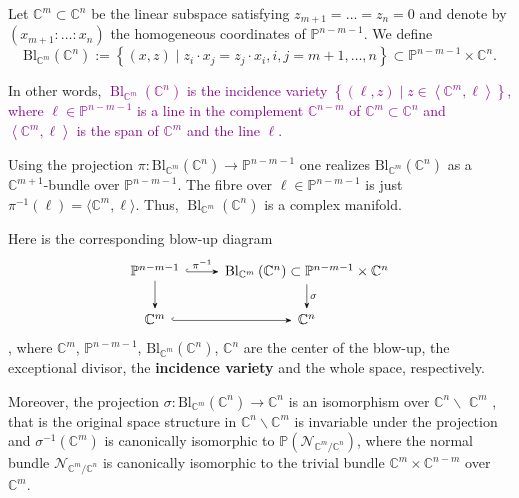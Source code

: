 \begin{example}
    Let $\mathbb{C}^m \subset \mathbb{C}^n$ be the linear subspace satisfying $z_{m+1}=\ldots=z_n=0$ and denote by $\left(x_{m+1}: \ldots: x_n\right)$ the homogeneous coordinates of $\mathbb{P}^{n-m-1}$. We define
$$
\mathrm{Bl}_{\mathbb{C}^m}\left(\mathbb{C}^n\right):=\left\{(x, z) \mid z_i \cdot x_j=z_j \cdot x_i, i, j=m+1, \ldots, n\right\} \subset \mathbb{P}^{n-m-1} \times \mathbb{C}^n .
$$

In other words, \textcolor{purple}{$\operatorname{Bl}_{\mathbb{C}^m}\left(\mathbb{C}^n\right)$ is the incidence variety $\left\{(\ell, z) \mid z \in\left\langle\mathbb{C}^m, \ell\right\rangle\right\}$, where $\ell \in \mathbb{P}^{n-m-1}$ is a line in the complement $\mathbb{C}^{n-m}$ of $\mathbb{C}^m \subset \mathbb{C}^n$ and $\left\langle\mathbb{C}^m, \ell\right\rangle$ is the span of $\mathbb{C}^m$ and the line $\ell$.}

Using the projection $\pi: \mathrm{Bl}_{\mathbb{C}^m}\left(\mathbb{C}^n\right) \rightarrow \mathbb{P}^{n-m-1}$ one realizes $\mathrm{Bl}_{\mathbb{C}^m}\left(\mathbb{C}^n\right)$ as a $\mathbb{C}^{m+1}$-bundle over $\mathbb{P}^{n-m-1}$. The fibre over $\ell \in \mathbb{P}^{n-m-1}$ is just $\pi^{-1}(\ell)=\langle \mathbb{C}^m,\ell\rangle$. Thus, $\operatorname{Bl}_{\mathbb{C}^m}(\mathbb{C}^n)$ is a complex manifold.

Here is the corresponding blow-up diagram
\[
    \begin{tikzcd}
        \mathbb{P}^{n-m-1}\dar[-Stealth]\rar[-Stealth,hook,"\pi^{-1}"] & \mathrm{Bl}_{\mathbb{C}^m}\left(\mathbb{C}^n\right) \subset \mathbb{P}^{n-m-1}\times \mathbb{C}^n\dar[-Stealth,"\sigma"]\\ 
        \mathbb{C}^m \rar[-Stealth,hook] & \mathbb{C}^n
    \end{tikzcd}
\]  
, where $\mathbb{C}^m$, $\mathbb{P}^{n-m-1}$, $\mathrm{Bl}_{\mathbb{C}^m}\left(\mathbb{C}^n\right)$, $\mathbb{C}^n$ are the center of the blow-up, the exceptional divisor,  the \textbf{incidence variety} and the whole space, respectively.

Moreover, the projection $\sigma: \mathrm{Bl}_{\mathbb{C}^m}\left(\mathbb{C}^n\right) \rightarrow \mathbb{C}^n$ is an isomorphism over $\mathbb{C}^n \backslash$ $\mathbb{C}^m$ , that is the original space structure in $\mathbb{C}^n\backslash\mathbb{C}^m$ is invariable under the projection and $\sigma^{-1}\left(\mathbb{C}^m\right)$ is canonically isomorphic to $\mathbb{P}\left(\mathcal{N}_{\mathbb{C}^m / \mathbb{C}^n}\right)$, where the normal bundle $\mathcal{N}_{\mathbb{C}^m / \mathbb{C}^n}$ is canonically isomorphic to the trivial bundle $\mathbb{C}^m \times \mathbb{C}^{n-m}$ over $\mathbb{C}^m$.
\end{example}

